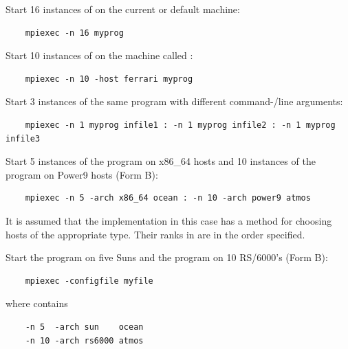 \begin{implementors}
\begin{example}
Start 16 instances of  on the current or default machine:
\begin{verbatim}
    mpiexec -n 16 myprog
\end{verbatim}
\end{example}
\begin{example}
%
Start 10 instances of  on the machine called :
\begin{verbatim}
    mpiexec -n 10 -host ferrari myprog
\end{verbatim}
\end{example}
\begin{example}
%
Start 3 instances of the same program  with different command\hyphen/line
  arguments:
\begin{verbatim}
    mpiexec -n 1 myprog infile1 : -n 1 myprog infile2 : -n 1 myprog infile3
\end{verbatim}
\end{example}
\begin{example}
%
  Start 5 instances of the  program on x86\_64 hosts and 10 instances of the  program on Power9 hosts (Form B):
\begin{verbatim}
    mpiexec -n 5 -arch x86_64 ocean : -n 10 -arch power9 atmos
\end{verbatim}
It is assumed that the implementation in this case has a method for choosing
hosts of the appropriate type.  Their ranks in  are in the order specified.
\end{example}
\begin{example}
%
  Start the  program on five Suns and the  program on 10
  RS/6000's (Form B):
\begin{verbatim}
    mpiexec -configfile myfile
\end{verbatim}
  where  contains
\begin{verbatim}
    -n 5  -arch sun    ocean
    -n 10 -arch rs6000 atmos
\end{verbatim}
\end{example}


\end{implementors}

